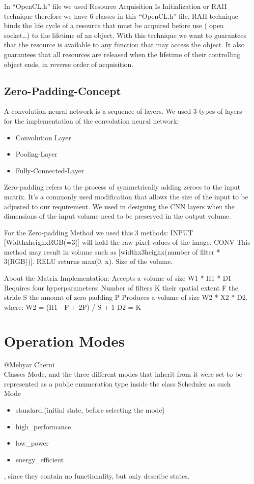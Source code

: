 \documentclass[parskip=full]{scrartcl}
\newcommand\tab[1][1cm]{\hspace*{#1}}
\begin{document}
In “OpenCL.h” file we used Resource Acquisition Is Initialization or RAII technique  therefore we have 6 classes in this “OpenCL.h” file. 
RAII technique binds the life cycle of a resource that must be acquired before use ( open socket…) to the lifetime of an object. 
With this technique we want to guarantees that the resource is available to any function that may access the object. It also guarantees that all resources are released when the lifetime of their controlling object ends, in reverse order of acquisition.
 
\pagebreak

\subsection{Zero-Padding-Concept}

A convolution neural network is a sequence of layers. We used 3 types of layers for the implementation of the convolution neural network:

\begin {itemize}
	\item Convolution Layer
	\item Pooling-Layer
	\item Fully-Connected-Layer
\end{itemize}

Zero-padding refers to the process of symmetrically adding zeroes to the input matrix. 
It's a commonly used modification that allows the size of the input to be adjusted to our requirement. We used in designing the CNN layers when the dimensions of the input volume need to be preserved in the output volume.

For the Zero-padding Method we used this 3 methods:
INPUT [WidthxheighxRGB(=3)] will hold the raw pixel values of the image.
CONV This method may result in volume such as [widthx3heighx(number of filter * 3(RGB))].
RELU returns max(0, x). Size of the volume.
    
About the Matrix Implementation:
Accepts a volume of size W1 * H1 * D1
Requires four hyperparameters: 
Number of filters K
their spatial extent F
the stride S
the amount of zero padding P
Produces a volume of size W2 * X2 * D2, where:
W2 = (H1 - F + 2P) / S + 1
D2 = K

\pagebreak


\section{Operation Modes} \label{Operation Modes}
	@Mehyar Cherni\\
	\tab Classes Mode, and the three different modes that inherit from it were set to be represented as a public enumeration type inside the class Scheduler as such \\ Mode
	\begin {itemize}
		\item standard,(initial state, before selecting the mode)
		\item high\_performance 
		\item low\_power
		\item energy\_efficient
	\end{itemize} 
	 , since they contain no functionality, but only describe states.


\pagebreak
\end{document}
